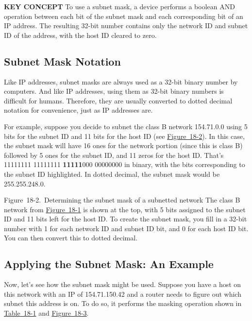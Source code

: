 {\textbf{KEY CONCEPT}} To use a subnet mask, a device performs a boolean
AND operation between each bit of the subnet mask and each corresponding
bit of an IP address. The resulting 32-bit number contains only the
network ID and subnet ID of the address, with the host ID cleared to
zero.



\subsection{Subnet Mask Notation}

Like IP addresses, subnet
masks are
always used as a 32-bit binary number by computers. And like IP
addresses, using them as 32-bit binary numbers is difficult for humans.
Therefore, they are usually converted to dotted decimal notation for
convenience, just as IP addresses are.

For example, suppose you
decide to
subnet the class B network 154.71.0.0 using 5 bits for the subnet ID and
11 bits for the host ID (see
\protect\hyperlink{ch18s03.htmlux5cux23determining_the_subnet_mask_of_a_subnett}{Figure~18-2}).
In this case, the subnet mask will have 16 ones for the network portion
(since this is class B) followed by 5 ones for the subnet ID, and 11
zeros for the host ID. That's 11111111 11111111 {\textbf{11111}}000
00000000 in binary, with the bits corresponding to the subnet ID
highlighted. In dotted decimal, the subnet mask would be 255.255.248.0.





Figure~18-2.~Determining the subnet mask of a subnetted network The
class B network from
\protect\hyperlink{ch18s02.htmlux5cux23subnetting_class_b_network_we_begin_with}{Figure~18-1}
is shown at the top, with 5 bits assigned to the subnet ID and 11 bits
left for the host ID. To create the subnet mask, you fill in a 32-bit
number with 1 for each network ID and subnet ID bit, and 0 for each host
ID bit. You can then convert this to dotted decimal.

\subsection{Applying the Subnet Mask: An Example}

Now, let's see how the subnet mask might be used. Suppose you have a
host on this network with an IP of 154.71.150.42 and a router needs to
figure out which subnet this address is on. To do so, it performs the
masking operation shown in
\protect\hyperlink{ch18s03.htmlux5cux23determining_the_subnet_id_of_an_ip_addre}{Table~18-1}
and
\protect\hyperlink{ch18s03.htmlux5cux23determining_the_subnet_id_of_an_ip-id001}{Figure~18-3}.



